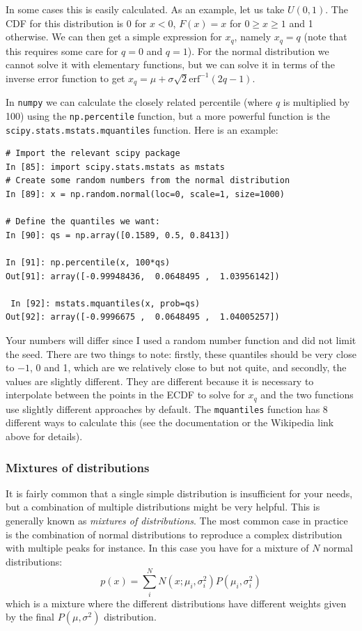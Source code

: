 \documentclass[a4paper,10pt]{article}
\begin{document}
In some cases this is easily calculated. As an example, let us take $U(0, 1)$. The CDF for this distribution is 0 for $x<0$, $F(x) = x$ for $0\ge x \ge 1$ and 1 otherwise. We can then get a simple expression for $x_q$, namely $x_q = q$ (note that this requires some care for $q=0$ and $q=1$). For the normal distribution we cannot solve it with elementary functions, but we can solve it in terms of the inverse error function to get $x_q = \mu + \sigma \sqrt{2}\mathrm{erf}^{-1}(2 q -1)$. 


In \texttt{numpy} we can calculate the closely related percentile (where $q$ is multiplied by 100) using the \texttt{np.percentile} function, but a more powerful function is the \texttt{scipy.stats.mstats.mquantiles} function. Here is an example:
\begin{lstlisting}
# Import the relevant scipy package
In [85]: import scipy.stats.mstats as mstats
# Create some random numbers from the normal distribution
In [89]: x = np.random.normal(loc=0, scale=1, size=1000)

# Define the quantiles we want:
In [90]: qs = np.array([0.1589, 0.5, 0.8413]) 

In [91]: np.percentile(x, 100*qs)
Out[91]: array([-0.99948436,  0.0648495 ,  1.03956142])

 In [92]: mstats.mquantiles(x, prob=qs) 
Out[92]: array([-0.9996675 ,  0.0648495 ,  1.04005257])
\end{lstlisting}


Your numbers will differ since I used a random number function and did not limit the seed. There are two things to note: firstly, these quantiles should be very close to $-1$, 0 and 1, which are we relatively close to but not quite, and secondly, the values are slightly different. They are different because it is necessary to interpolate between the points in the ECDF to solve for $x_q$ and the two functions use slightly different approaches by default. The \texttt{mquantiles} function has 8 different ways to calculate this (see the documentation or the Wikipedia link above for details).

\subsubsection{ Mixtures of distributions}

It is fairly common that a single simple distribution is insufficient for your needs, but a combination of multiple distributions might be very helpful. This is generally known as \textit{mixtures of distributions}. The most common case in practice is the combination of normal distributions to reproduce a complex distribution with multiple peaks  for instance. In this case you have for a mixture of $N$ normal distributions:
$$p(x) = \sum_{i}^{N} N\left(x; \mu_i, \sigma_i^2\right) P\left(\mu_i,\sigma_i^2 \right)$$
which is a mixture where the different distributions have different weights given by the final $P(\mu, \sigma^2)$ distribution.
\end{document}

